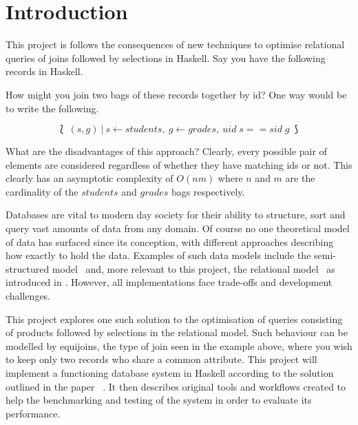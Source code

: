 \chapter{Introduction}
\begin{comment}
The introduction should summarise the subject area, the specific problem you are addressing, including key ideas for their solution, together with a summary of the project's main contributions. When detailing the contributions it is helpful to provide forward references to the section(s) of the report that provide the relevant technical details. The introduction should be aimed at an informed, but otherwise non-expert, reader. A good tip is to assume that all your assessors will read the abstract and introduction, whereas the more detailed technical sections may only be read by your first and second markers - it's therefore really important to get it right.
\end{comment}

This project is follows the consequences of new techniques to optimise
relational queries of joins followed by selections in Haskell. Say you have the
following records in Haskell.



\noindent
How might you join two bags of these records together by id? One way would be to
write the following.

\[\lbag\:(s, g)\:|\:s \leftarrow students,\:g \leftarrow grades,\:uid\;s == sid\;g
\:\rbag\]

What are the disadvantages of this approach? Clearly, every possible pair of
elements are considered regardless of whether they have matching ids or not.
This clearly has an asymptotic complexity of $O(nm)$ where $n$ and $m$ are the
cardinality of the $students$ and $grades$ bags respectively.

Databases are vital to modern day society for their ability to structure, sort
and query vast amounts of data from any domain. Of course no one theoretical
model of data has surfaced since its conception, with different approaches
describing how exactly to hold the data. Examples of such data models include
the semi-structured model~\cite{DatabaseSystems} and, more relevant to this
project, the relational model~\cite{RelationalModel} as introduced in
. However, all implementations face trade-offs and
development challenges.

This project explores one such solution to the optimisation of queries
consisting of products followed by selections in the relational model. Such
behaviour can be modelled by equijoins, the type of join seen in the example
above, where you wish to keep only two records who share a common attribute.
This project will implement a functioning database system in Haskell according
to the solution outlined in the paper
\relalg{}~\cite{RelationalAlgebraByWayOfAdjunctions}. It then describes original
tools and workflows created to help the benchmarking and testing of the system
in order to evaluate its performance.

